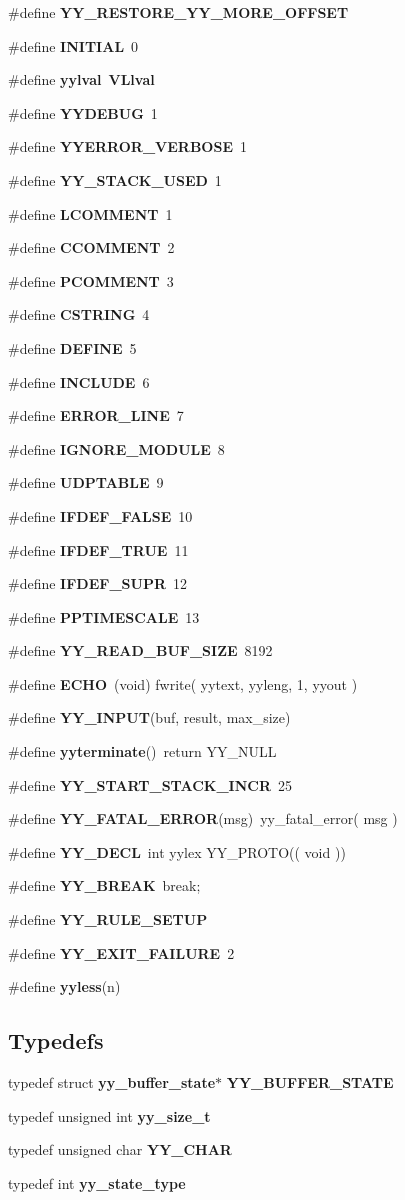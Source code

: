 \begin{CompactItemize}
\item 
\#define {\bf YY\_\-RESTORE\_\-YY\_\-MORE\_\-OFFSET}
\item 
\#define {\bf INITIAL}\ 0
\item 
\#define {\bf yylval}\ {\bf VLlval}
\item 
\#define {\bf YYDEBUG}\ 1
\item 
\#define {\bf YYERROR\_\-VERBOSE}\ 1
\item 
\#define {\bf YY\_\-STACK\_\-USED}\ 1
\item 
\#define {\bf LCOMMENT}\ 1
\item 
\#define {\bf CCOMMENT}\ 2
\item 
\#define {\bf PCOMMENT}\ 3
\item 
\#define {\bf CSTRING}\ 4
\item 
\#define {\bf DEFINE}\ 5
\item 
\#define {\bf INCLUDE}\ 6
\item 
\#define {\bf ERROR\_\-LINE}\ 7
\item 
\#define {\bf IGNORE\_\-MODULE}\ 8
\item 
\#define {\bf UDPTABLE}\ 9
\item 
\#define {\bf IFDEF\_\-FALSE}\ 10
\item 
\#define {\bf IFDEF\_\-TRUE}\ 11
\item 
\#define {\bf IFDEF\_\-SUPR}\ 12
\item 
\#define {\bf PPTIMESCALE}\ 13
\item 
\#define {\bf YY\_\-READ\_\-BUF\_\-SIZE}\ 8192
\item 
\#define {\bf ECHO}\ (void) fwrite( yytext, yyleng, 1, yyout )
\item 
\#define {\bf YY\_\-INPUT}(buf, result, max\_\-size)
\item 
\#define {\bf yyterminate}()\ return YY\_\-NULL
\item 
\#define {\bf YY\_\-START\_\-STACK\_\-INCR}\ 25
\item 
\#define {\bf YY\_\-FATAL\_\-ERROR}(msg)\ yy\_\-fatal\_\-error( msg )
\item 
\#define {\bf YY\_\-DECL}\ int yylex YY\_\-PROTO(( void ))
\item 
\#define {\bf YY\_\-BREAK}\ break;
\item 
\#define {\bf YY\_\-RULE\_\-SETUP}
\item 
\#define {\bf YY\_\-EXIT\_\-FAILURE}\ 2
\item 
\#define {\bf yyless}(n)
\end{CompactItemize}
\subsection*{Typedefs}
\begin{CompactItemize}
\item 
typedef struct {\bf yy\_\-buffer\_\-state}$\ast$ {\bf YY\_\-BUFFER\_\-STATE}
\item 
typedef unsigned int {\bf yy\_\-size\_\-t}
\item 
typedef unsigned char {\bf YY\_\-CHAR}
\item 
typedef int {\bf yy\_\-state\_\-type}
\end{CompactItemize}
